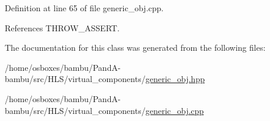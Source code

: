 Definition at line 65 of file generic\+\_\+obj.\+cpp.



References T\+H\+R\+O\+W\+\_\+\+A\+S\+S\+E\+RT.



The documentation for this class was generated from the following files\+:\begin{DoxyCompactItemize}
\item 
/home/osboxes/bambu/\+Pand\+A-\/bambu/src/\+H\+L\+S/virtual\+\_\+components/\hyperlink{generic__obj_8hpp}{generic\+\_\+obj.\+hpp}\item 
/home/osboxes/bambu/\+Pand\+A-\/bambu/src/\+H\+L\+S/virtual\+\_\+components/\hyperlink{generic__obj_8cpp}{generic\+\_\+obj.\+cpp}\end{DoxyCompactItemize}
